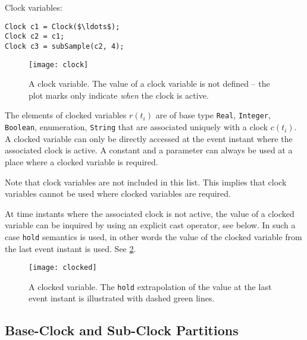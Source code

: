 \begin{example}
Clock variables:
\begin{lstlisting}[language=modelica]
Clock c1 = Clock($\ldots$);
Clock c2 = c1;
Clock c3 = subSample(c2, 4);
\end{lstlisting}
\end{example}

\begin{figure}[H]
  \begin{center}
    \texttt{[image: clock]}
  \end{center}
  \caption{A clock variable.  The value of a clock variable is not defined -- the plot marks only indicate \emph{when} the clock is active.}\label{fig:clock-variable}
\end{figure}

\begin{definition}\label{def:clocked-variable}
The elements of clocked variables $r(t_{i})$ are of base type \lstinline!Real!, \lstinline!Integer!, \lstinline!Boolean!, enumeration, \lstinline!String! that are associated uniquely with
a clock $c(t_{i})$. A clocked variable can only be directly accessed at the event instant where the associated clock is active.  A constant and a parameter can always be used at a place
where a clocked variable is required.
\begin{nonnormative}
Note that clock variables are not included in this list.
This implies that clock variables cannot be used where clocked variables are required.
\end{nonnormative}

At time instants where the associated clock is not active, the value of a clocked variable can be inquired by using an explicit cast operator, see below.  In such a case \lstinline!hold! semantics is
used, in other words the value of the clocked variable from the last event instant is used.  See \cref{fig:clocked-variable}.
\end{definition}

\begin{figure}[H]
  \begin{center}
    \texttt{[image: clocked]}
  \end{center}
  \caption{A clocked variable.  The \lstinline!hold! extrapolation of the value at the last event instant is illustrated with dashed green lines.}\label{fig:clocked-variable}
\end{figure}

\subsection{Base-Clock and Sub-Clock Partitions}\label{base-clock-and-sub-clock-partitions}

